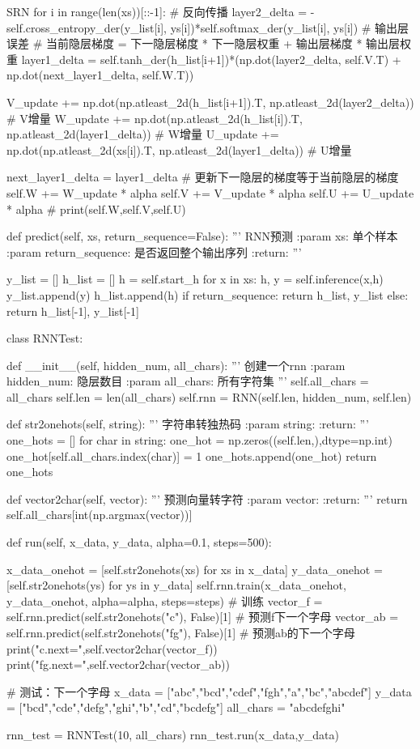 \documentclass[openbib]{article}
\begin{document}
\begin{Python}{SRN}
			for i in range(len(xs))[::-1]:  # 反向传播
				layer2_delta = -self.cross_entropy_der(y_list[i], ys[i])*self.softmax_der(y_list[i], ys[i])  # 输出层误差
				# 当前隐层梯度 = 下一隐层梯度 * 下一隐层权重 + 输出层梯度 * 输出层权重
				layer1_delta = self.tanh_der(h_list[i+1])*(np.dot(layer2_delta, self.V.T) + np.dot(next_layer1_delta, self.W.T))

				V_update += np.dot(np.atleast_2d(h_list[i+1]).T, np.atleast_2d(layer2_delta))  # V增量
				W_update += np.dot(np.atleast_2d(h_list[i]).T,  np.atleast_2d(layer1_delta))  # W增量
				U_update += np.dot(np.atleast_2d(xs[i]).T,  np.atleast_2d(layer1_delta))  # U增量

				next_layer1_delta = layer1_delta  # 更新下一隐层的梯度等于当前隐层的梯度
			self.W += W_update * alpha
			self.V += V_update * alpha
			self.U += U_update * alpha
# print(self.W,self.V,self.U)

def predict(self, xs, return_sequence=False):
	'''
	RNN预测
	:param xs: 单个样本
	:param return_sequence: 是否返回整个输出序列
	:return:
	'''

	y_list = []
	h_list = []
	h = self.start_h
	for x in xs:
		h, y = self.inference(x,h)
		y_list.append(y)
		h_list.append(h)
	if return_sequence:
		return h_list, y_list
	else:
		return h_list[-1], y_list[-1]
	
class RNNTest:

	def __init__(self, hidden_num, all_chars):
		'''
		创建一个rnn
		:param hidden_num: 隐层数目
		:param all_chars: 所有字符集
		'''
		self.all_chars = all_chars
		self.len = len(all_chars)
		self.rnn = RNN(self.len, hidden_num, self.len)

	def str2onehots(self, string):
		'''
		字符串转独热码
		:param string:
		:return:
		'''
		one_hots = []
		for char in string:
		one_hot = np.zeros((self.len,),dtype=np.int)
		one_hot[self.all_chars.index(char)] = 1
		one_hots.append(one_hot)
		return one_hots

	def vector2char(self, vector):
		'''
		预测向量转字符
		:param vector:
		:return:
		'''
		return self.all_chars[int(np.argmax(vector))]

	def run(self, x_data, y_data, alpha=0.1, steps=500):

		x_data_onehot = [self.str2onehots(xs) for xs in x_data]
		y_data_onehot = [self.str2onehots(ys) for ys in y_data]
		self.rnn.train(x_data_onehot, y_data_onehot, alpha=alpha, steps=steps) # 训练
		vector_f = self.rnn.predict(self.str2onehots("c"), False)[1] # 预测f下一个字母
		vector_ab = self.rnn.predict(self.str2onehots("fg"), False)[1] # 预测ab的下一个字母
		print("c.next=",self.vector2char(vector_f))
		print("fg.next=",self.vector2char(vector_ab))


# 测试：下一个字母
x_data = ["abc","bcd","cdef","fgh","a","bc","abcdef"]
y_data = ["bcd","cde","defg","ghi","b","cd","bcdefg"]
all_chars = "abcdefghi"

rnn_test = RNNTest(10, all_chars)
rnn_test.run(x_data,y_data)

\end{Python}
\end{document}
